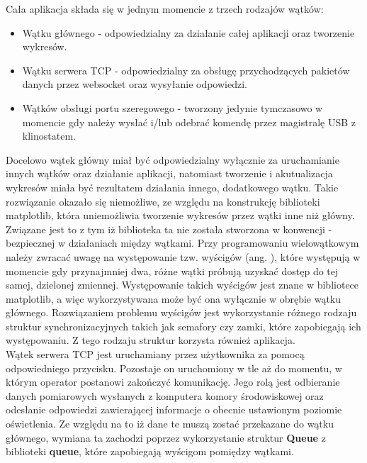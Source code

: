 Cała aplikacja składa się w jednym momencie z trzech rodzajów wątków:
\begin{itemize}
	\item Wątku głównego - odpowiedzialny za działanie całej aplikacji oraz tworzenie wykresów.
	\item Wątku serwera TCP - odpowiedzialny za obsługę przychodzących pakietów danych przez websocket oraz wysyłanie odpowiedzi.
	\item Wątków obsługi portu szeregowego - tworzony jedynie tymczasowo w momencie gdy należy wysłać i/lub odebrać komendę przez magistralę USB z klinostatem.
\end{itemize}
Docelowo wątek główny miał być odpowiedzialny wyłącznie za uruchamianie innych wątków oraz działanie aplikacji, natomiast tworzenie i akutualizacja wykresów miała być rezultatem działania innego, dodatkowego wątku. Takie rozwiązanie okazało się niemożliwe, ze względu na konstrukcję biblioteki matplotlib, która uniemożliwia tworzenie wykresów przez wątki inne niż główny. Związane jest to z tym iż biblioteka ta nie została stworzona w konwencji  - bezpiecznej w działaniach między wątkami. Przy programowaniu wielowątkowym należy zwracać uwagę na występowanie tzw. wyścigów (ang. ), które występują w momencie gdy przynajmniej dwa, różne wątki próbują uzyskać dostęp do tej samej, dzielonej zmiennej. Występowanie takich wyścigów jest znane w bibliotece matplotlib, a więc wykorzystywana może być ona wyłącznie w obrębie wątku głównego. Rozwiązaniem problemu wyścigów jest wykorzystanie różnego rodzaju struktur synchronizacyjnych takich jak semafory czy zamki, które zapobiegają ich występowaniu. Z tego rodzaju struktur korzysta również aplikacja.\\

Wątek serwera TCP jest uruchamiany przez użytkownika za pomocą odpowiedniego przycisku. Pozostaje on uruchomiony w tle aż do momentu, w którym operator postanowi zakończyć komunikację. Jego rolą jest odbieranie danych pomiarowych wysłanych z komputera komory środowiskowej oraz odesłanie odpowiedzi zawierającej informacje o obecnie ustawionym poziomie oświetlenia. Ze względu na to iż dane te muszą zostać przekazane do wątku głównego, wymiana ta zachodzi poprzez wykorzystanie struktur \textbf{Queue} z biblioteki \textbf{queue}, które zapobiegają wyścigom pomiędzy wątkami.\\

